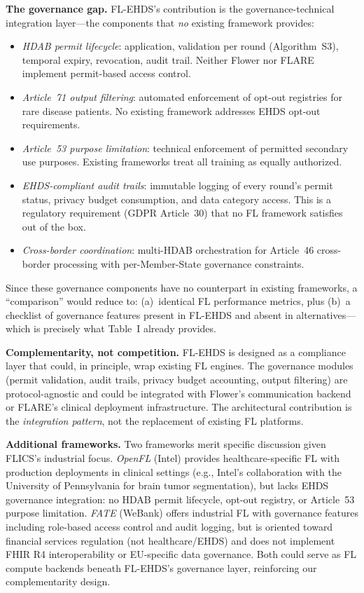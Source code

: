 \documentclass[conference,a4paper]{IEEEtran}
\begin{document}
\textbf{The governance gap.} FL-EHDS's contribution is the governance-technical integration layer---the components that \textit{no} existing framework provides:
\begin{itemize}
    \item \textit{HDAB permit lifecycle}: application, validation per round (Algorithm~S3), temporal expiry, revocation, audit trail. Neither Flower nor FLARE implement permit-based access control.
    \item \textit{Article~71 output filtering}: automated enforcement of opt-out registries for rare disease patients. No existing framework addresses EHDS opt-out requirements.
    \item \textit{Article~53 purpose limitation}: technical enforcement of permitted secondary use purposes. Existing frameworks treat all training as equally authorized.
    \item \textit{EHDS-compliant audit trails}: immutable logging of every round's permit status, privacy budget consumption, and data category access. This is a regulatory requirement (GDPR Article~30) that no FL framework satisfies out of the box.
    \item \textit{Cross-border coordination}: multi-HDAB orchestration for Article~46 cross-border processing with per-Member-State governance constraints.
\end{itemize}

Since these governance components have no counterpart in existing frameworks, a ``comparison'' would reduce to: (a)~identical FL performance metrics, plus (b)~a checklist of governance features present in FL-EHDS and absent in alternatives---which is precisely what Table~I already provides.

\textbf{Complementarity, not competition.} FL-EHDS is designed as a compliance layer that could, in principle, wrap existing FL engines. The governance modules (permit validation, audit trails, privacy budget accounting, output filtering) are protocol-agnostic and could be integrated with Flower's communication backend or FLARE's clinical deployment infrastructure. The architectural contribution is the \textit{integration pattern}, not the replacement of existing FL platforms.

\textbf{Additional frameworks.} Two frameworks merit specific discussion given FLICS's industrial focus. \textit{OpenFL} (Intel) provides healthcare-specific FL with production deployments in clinical settings (e.g., Intel's collaboration with the University of Pennsylvania for brain tumor segmentation), but lacks EHDS governance integration: no HDAB permit lifecycle, opt-out registry, or Article~53 purpose limitation. \textit{FATE} (WeBank) offers industrial FL with governance features including role-based access control and audit logging, but is oriented toward financial services regulation (not healthcare/EHDS) and does not implement FHIR R4 interoperability or EU-specific data governance. Both could serve as FL compute backends beneath FL-EHDS's governance layer, reinforcing our complementarity design.
\end{document}
